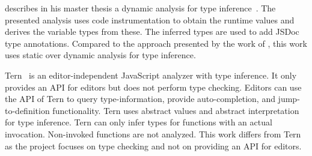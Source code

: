 \citeauthor{Odgaard2014} describes in his master thesis a dynamic analysis for type inference~\cite{Odgaard2014}. The presented analysis uses code instrumentation to obtain the runtime values and derives the variable types from these. The inferred types are used to add JSDoc~\cite{JSDoc} type annotations. Compared to the approach presented by the work of \citeauthor{Odgaard2014}, this work uses static over dynamic analysis for type inference. 

Tern~\cite{Haverbeke} is an editor-independent JavaScript analyzer with type inference. It only provides an API for editors but does not perform type checking. Editors can use the API of Tern to query type-information, provide auto-completion, and jump-to-definition functionality. Tern uses abstract values and abstract interpretation for type inference. Tern can only infer types for functions with an actual invocation. Non-invoked functions are not analyzed. This work differs from Tern as the project focuses on type checking and not on providing an API for editors. 